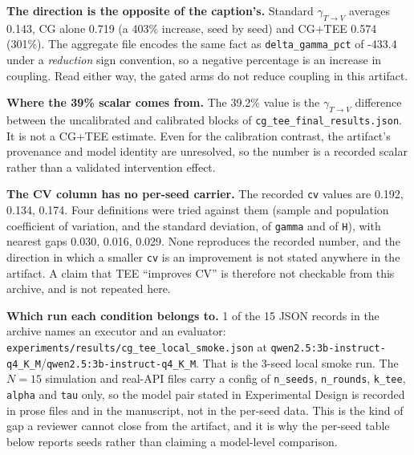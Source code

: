 \noindent\textbf{The direction is the opposite of the caption's.} Standard $\gamma_{T\to V}$ averages 0.143, CG alone 0.719 (a 403\% increase, seed by seed) and CG+TEE 0.574 (301\%). The aggregate file encodes the same fact as \texttt{delta\_gamma\_pct} of -433.4 under a \emph{reduction} sign convention, so a negative percentage is an increase in coupling. Read either way, the gated arms do not reduce coupling in this artifact.

\noindent\textbf{Where the 39\% scalar comes from.} The 39.2\% value is the $\gamma_{T\to V}$ difference between the uncalibrated and calibrated blocks of \texttt{cg\_tee\_final\_results.json}. It is not a CG+TEE estimate. Even for the calibration contrast, the artifact's provenance and model identity are unresolved, so the number is a recorded scalar rather than a validated intervention effect.

\noindent\textbf{The CV column has no per-seed carrier.} The recorded \texttt{cv} values are 0.192, 0.134, 0.174. Four definitions were tried against them (sample and population coefficient of variation, and the standard deviation, of \texttt{gamma} and of \texttt{H}), with nearest gaps 0.030, 0.016, 0.029. None reproduces the recorded number, and the direction in which a smaller \texttt{cv} is an improvement is not stated anywhere in the artifact. A claim that TEE ``improves CV'' is therefore not checkable from this archive, and is not repeated here.

\noindent\textbf{Which run each condition belongs to.} 1 of the 15 JSON records in the archive names an executor and an evaluator: \texttt{experiments/results/cg\_tee\_local\_smoke.json} at \texttt{qwen2.5:3b-instruct-q4\_K\_M}/\texttt{qwen2.5:3b-instruct-q4\_K\_M}. That is the 3-seed local smoke run. The $N{=}15$ simulation and real-API files carry a config of \texttt{n\_seeds}, \texttt{n\_rounds}, \texttt{k\_tee}, \texttt{alpha} and \texttt{tau} only, so the model pair stated in Experimental Design is recorded in prose files and in the manuscript, not in the per-seed data. This is the kind of gap a reviewer cannot close from the artifact, and it is why the per-seed table below reports seeds rather than claiming a model-level comparison.

